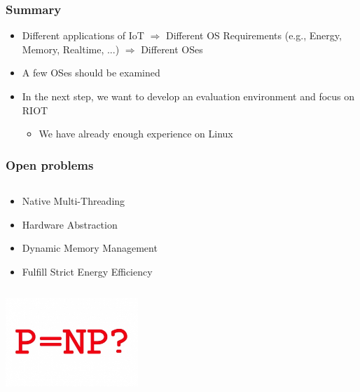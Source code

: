 \documentclass{beamer}
\begin{document}
\begin{frame}
	\frametitle{Summary}
	\begin{itemize}
		\justifying
		\item Different applications of IoT $\Rightarrow$ Different OS Requirements (e.g., Energy, Memory, Realtime, ...) $\Rightarrow$ Different OSes
		\item A few OSes should be examined
		\item In the next step, we want to develop an evaluation environment and focus on RIOT 
		\begin{itemize}
			\item We have already enough experience on Linux 
		\end{itemize}
		\end{itemize}
\end{frame}


\begin{frame}
	\frametitle{Open problems}
	\begin{columns}[c]
		\begin{column}{30cm}
			\vspace{.1cm}
			\begin{itemize}
				\justifying
				\item Native Multi-Threading
				\item Hardware Abstraction
				\item Dynamic Memory Management
				\item Fulfill Strict Energy Efficiency
			\end{itemize}
		\end{column}
	\end{columns}
	\vspace{.5cm}
	\hspace*{5.5cm} \includegraphics[width=5cm]{figs/open-problems.jpg}
\end{frame}
\end{document}
